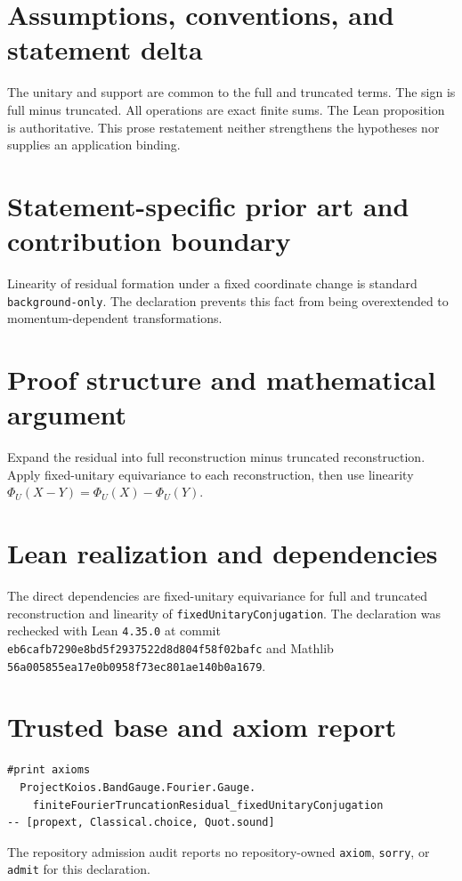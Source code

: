 \documentclass[11pt]{article}
\begin{document}
\section{Assumptions, conventions, and statement delta}
The unitary and support are common to the full and truncated terms.  The sign is full minus truncated.  All operations are exact finite sums.
The Lean proposition is authoritative.  This prose restatement neither strengthens the hypotheses
nor supplies an application binding.

\section{Statement-specific prior art and contribution boundary}
Linearity of residual formation under a fixed coordinate change is standard \texttt{background-only}.  The declaration prevents this fact from being overextended to momentum-dependent transformations.

\section{Proof structure and mathematical argument}
Expand the residual into full reconstruction minus truncated reconstruction.  Apply fixed-unitary equivariance to each reconstruction, then use linearity $\Phi_U(X-Y)=\Phi_U(X)-\Phi_U(Y)$.

\section{Lean realization and dependencies}
The direct dependencies are fixed-unitary equivariance for full and truncated reconstruction and linearity of \texttt{fixedUnitaryConjugation}.  The declaration was rechecked with Lean \texttt{4.35.0} at commit \texttt{eb6cafb7290e8bd5f2937522d8d804f58f02bafc} and Mathlib \texttt{56a005855ea17e0b0958f73ec801ae140b0a1679}.

\section{Trusted base and axiom report}
\begin{verbatim}
#print axioms
  ProjectKoios.BandGauge.Fourier.Gauge.
    finiteFourierTruncationResidual_fixedUnitaryConjugation
-- [propext, Classical.choice, Quot.sound]
\end{verbatim}
The repository admission audit reports no repository-owned \texttt{axiom}, \texttt{sorry}, or
\texttt{admit} for this declaration.
\end{document}

